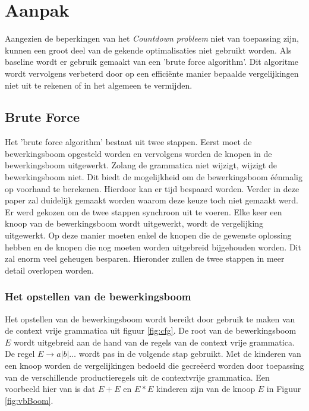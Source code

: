 \documentclass[Main.tex]{subfiles}
\begin{document}
\section{Aanpak}
Aangezien de beperkingen van het \textit{Countdown probleem} niet van toepassing zijn, kunnen een groot deel van de gekende optimalisaties niet gebruikt worden. Als baseline wordt er gebruik gemaakt van een 'brute force algorithm'. Dit algoritme wordt vervolgens verbeterd door op een effici\"ente manier bepaalde vergelijkingen niet uit te rekenen of in het algemeen te vermijden.

\subsection{Brute Force}
Het 'brute force algorithm' bestaat uit twee stappen. Eerst moet de bewerkingsboom opgesteld worden en vervolgens worden de knopen in de bewerkingsboom uitgewerkt. Zolang de grammatica niet wijzigt, wijzigt de bewerkingsboom niet. Dit biedt de mogelijkheid om de bewerkingsboom \'e\'enmalig op voorhand te berekenen. Hierdoor kan er tijd bespaard worden. Verder in deze paper zal duidelijk gemaakt worden waarom deze keuze toch niet gemaakt werd. Er werd gekozen om de twee stappen synchroon uit te voeren. Elke keer een knoop van de bewerkingsboom wordt uitgewerkt, wordt de vergelijking uitgewerkt. Op deze manier moeten enkel de knopen die de gewenste oplossing hebben en de knopen die nog moeten worden uitgebreid bijgehouden worden. Dit zal enorm veel geheugen besparen. Hieronder zullen de twee stappen in meer detail overlopen worden. 

\subsubsection*{Het opstellen van de bewerkingsboom}
Het opstellen van de bewerkingsboom wordt bereikt door gebruik te maken van de context vrije grammatica uit figuur \ref{fig:cfg}. De root van de bewerkingsboom $E$ wordt uitgebreid aan de hand van de regels van de context vrije grammatica. De regel $E \rightarrow a | b | \dotsc$ wordt pas in de volgende stap gebruikt. Met de kinderen van een knoop worden de vergelijkingen bedoeld die gecre\"eerd worden door toepassing van de verschillende productieregels uit de contextvrije grammatica. Een voorbeeld hier van is dat $E+E$ en $E*E$ kinderen zijn van de knoop $E$ in Figuur \ref{fig:vbBoom}.
\end{document}

